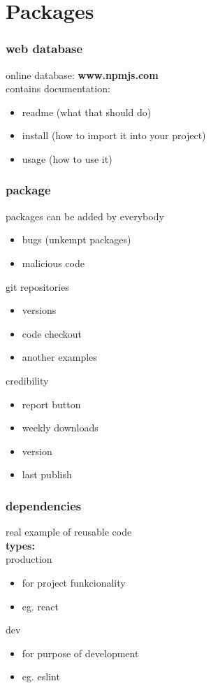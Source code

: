 \documentclass{beamer}
\begin{document}
\section{Packages}

\begin{frame}
\frametitle{web database}
online database:  \textbf{www.npmjs.com}\\
contains documentation:
\begin{itemize}
\item readme (what that should do)
\item install (how to import it into your project)
\item usage (how to use it)
\end{itemize}
\end{frame}

\begin{frame}
\frametitle{package}
packages can be added by everybody
\begin{itemize}
\item bugs (unkempt packages)
\item malicious code
\end{itemize}
git repositories
\begin{itemize}
\item versions
\item code checkout
\item another examples
\end{itemize}
credibility
\begin{itemize}
\item report button
\item weekly downloads
\item version
\item last publish
\end{itemize}
\end{frame}

\begin{frame}
\frametitle{dependencies}
real example of reusable code \\
\textbf{types:}\\
production
\begin{itemize}
\item for project funkcionality
\item eg. react
\end{itemize}
dev
\begin{itemize}
\item for purpose of development
\item eg. eslint
\end{itemize}
\end{frame}
\end{document}
